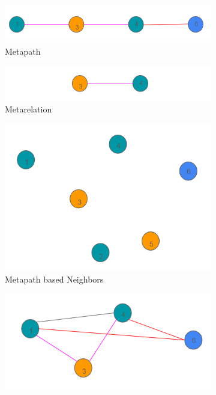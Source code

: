 \documentclass{report} %
\begin{document}
\begin{figure}[H]
    \centering
    \begin{subfigure}{0.35\textwidth}
        \centering
        \includegraphics[width=\textwidth]{./ReportImages/Metapath.png}
        \caption{Metapath} 
        \label{fig:Metapath}
    \end{subfigure}\hfill
    \begin{subfigure}{0.35\textwidth}
        \centering
        \includegraphics[width=\textwidth]{./ReportImages/Metarelation.png}
        \caption{Metarelation}
        \label{fig:Metarelation}
    \end{subfigure}\vfill
    \begin{subfigure}{0.35\textwidth}
        \centering
        \includegraphics[width=\textwidth]{./ReportImages/MetapathNeighbors.png}
        \caption{Metapath based Neighbors} 
        \label{fig:MetapathNeighbors}
    \end{subfigure}\hfill
    \begin{subfigure}{0.35\textwidth}
        \centering
        \includegraphics[width=\textwidth]{./ReportImages/Metasubgraph.png}

\end{subfigure}
\end{figure}
\end{document}

